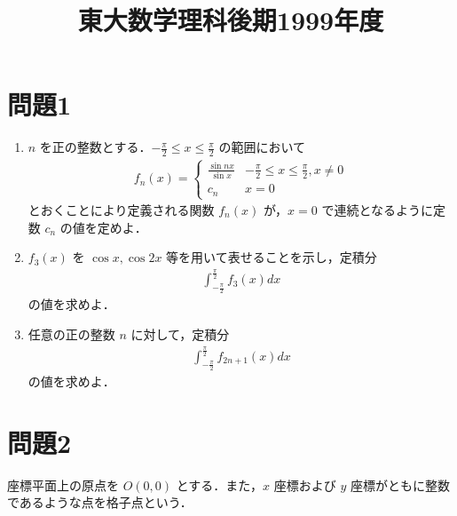 \documentclass[unicode,12pt, A4j]{ltjsarticle}%
\title{東大数学理科後期1999年度}
\author{}
\date{}
\begin{document}
\maketitle

\section{問題1}

\begin{enumerate}
  \item $n$ を正の整数とする．$-\frac{\pi}{2} \le x \le \frac{\pi}{2}$ の範囲において
    \begin{align}
      f_n(x) = 
        \begin{cases} 
          \frac{\sin nx}{\sin x} & -\frac{\pi}{2} \le x \le \frac{\pi}{2},x \ne 0 \\ 
          c_n & x = 0 
        \end{cases} 
      \end{align}
とおくことにより定義される関数 $f_n(x)$ が，$x=0$ で連続となるように定数 $c_n$ の値を定めよ．  
  \item $f_3(x)$ を $\cos x, \cos 2x$ 等を用いて表せることを示し，定積分
\begin{align}
  \int_{-\frac{\pi}{2}}^{\frac{\pi}{2}} f_3(x) dx   
\end{align}
の値を求めよ．
  \item 任意の正の整数 $n$ に対して，定積分
\begin{align}
 \int_{-\frac{\pi}{2}}^{\frac{\pi}{2}} f_{2n+1}(x) dx   
\end{align}
の値を求めよ．
\end{enumerate}

\section{問題2}
座標平面上の原点を $O(0,0)$ とする．また，$x$ 座標および $y$ 座標がともに整数であるような点を格子点という．
\end{document}
